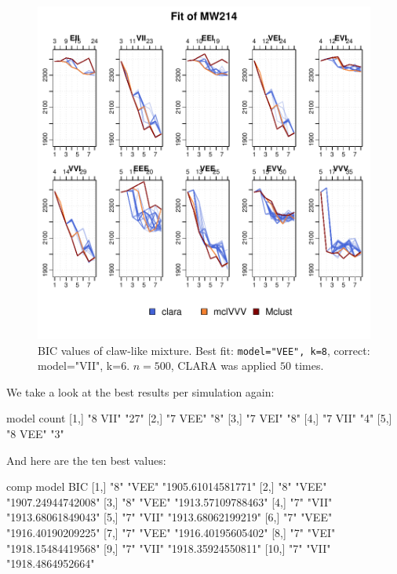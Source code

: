 \begin{figure}[h!]
    \begin{Rgraph}[0.9]
\includegraphics{chapter3-figMW214bic}
    \caption{BIC values of claw-like mixture. Best fit: {\tt model="VEE", k=8},
             correct: {model="VII", k=6}. $n=500$, CLARA was applied $50$ times.}
    \label{fig:214bis11}
    \end{Rgraph}
\end{figure}

We take a look at the best results per simulation again:

\begin{Schunk}
\begin{Soutput}
     model   count
[1,] "8 VII" "27" 
[2,] "7 VEE" "8"  
[3,] "7 VEI" "8"  
[4,] "7 VII" "4"  
[5,] "8 VEE" "3"  
\end{Soutput}
\end{Schunk}

And here are the ten best values:

\begin{Schunk}
\begin{Soutput}
      comp model BIC               
 [1,] "8"  "VEE" "1905.61014581771"
 [2,] "8"  "VEE" "1907.24944742008"
 [3,] "8"  "VEE" "1913.57109788463"
 [4,] "7"  "VII" "1913.68061849043"
 [5,] "7"  "VII" "1913.68062199219"
 [6,] "7"  "VEE" "1916.40190209225"
 [7,] "7"  "VEE" "1916.40195605402"
 [8,] "7"  "VEI" "1918.15484419568"
 [9,] "7"  "VII" "1918.35924550811"
[10,] "7"  "VII" "1918.4864952664" 
\end{Soutput}
\end{Schunk}

